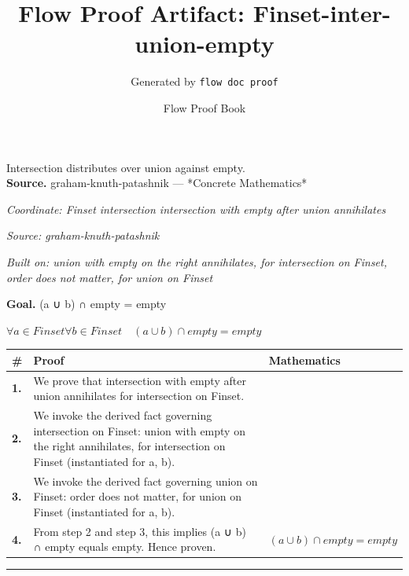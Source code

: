 \documentclass[11pt]{article}
\title{Flow Proof Artifact: Finset-inter-union-empty}
\author{Generated by \texttt{flow doc proof}}
\date{Flow Proof Book}
\theoremstyle{definition}
\begin{document}
\maketitle
Intersection distributes over union against empty.\\[0.5em]
\textbf{Source.} graham-knuth-patashnik — *Concrete Mathematics*\\[0.5em]
\bigskip
{}\par
\smallskip\noindent\textit{Coordinate: Finset \cdot intersection \cdot intersection with empty after union annihilates}\par
\smallskip\noindent\textit{Source: graham-knuth-patashnik}\par
\smallskip\noindent\textit{Built on: union with empty on the right annihilates, for intersection on Finset, order does not matter, for union on Finset}\par
\medskip
\noindent\textbf{Goal.} (a ∪ b) ∩ empty = empty\par
\noindent$\displaystyle \forall a \in Finset \forall b \in Finset\quad (a ∪ b) ∩ empty = empty$\par
\medskip
\noindent
\begin{tabular}{@{} >{\raggedright\arraybackslash}p{} >{\raggedright\arraybackslash}p{} >{\raggedleft\arraybackslash}p{} @{}}
\textbf{\#} & \textbf{Proof} & \textbf{Mathematics} \\
\midrule
\textbf{1.} & We prove that intersection with empty after union annihilates for intersection on Finset. & \\[0.45em]
\textbf{2.} & We invoke the derived fact governing intersection on Finset: union with empty on the right annihilates, for intersection on Finset (instantiated for a, b). & \\[0.45em]
\textbf{3.} & We invoke the derived fact governing union on Finset: order does not matter, for union on Finset (instantiated for a, b). & \\[0.45em]
\textbf{4.} & From step 2 and step 3, this implies (a ∪ b) ∩ empty equals empty. Hence proven. & $\displaystyle (a ∪ b) ∩ empty = empty$ \\[0.45em]
\bottomrule
\end{tabular}
\label{thm:Finset-intersection-intersection_with_empty_after_union_annihilates}
\par\medskip\hrule
\end{document}

